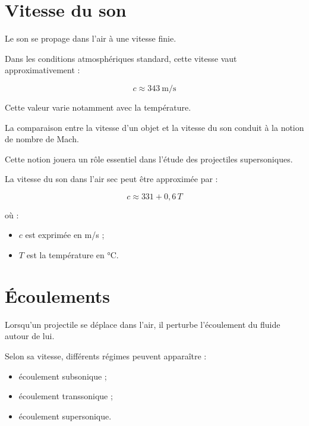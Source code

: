 \section{Vitesse du son}

Le son se propage dans l'air à une vitesse finie.

Dans les conditions atmosphériques standard, cette vitesse vaut
approximativement :

\begin{equation}
c \approx 343~\mathrm{m/s}
\end{equation}

Cette valeur varie notamment avec la température.

La comparaison entre la vitesse d'un objet et la vitesse du son conduit à
la notion de nombre de Mach.

Cette notion jouera un rôle essentiel dans l'étude des projectiles
supersoniques.

\begin{rigueur}

La vitesse du son dans l'air sec peut être approximée par :

\begin{equation}
c \approx 331 + 0,6\,T
\end{equation}

où :

\begin{itemize}
    \item $c$ est exprimée en m/s ;
    \item $T$ est la température en °C.
\end{itemize}

\end{rigueur}

\section{Écoulements}

Lorsqu'un projectile se déplace dans l'air, il perturbe l'écoulement du
fluide autour de lui.

Selon sa vitesse, différents régimes peuvent apparaître :

\begin{itemize}
\item écoulement subsonique ;
\item écoulement transsonique ;
\item écoulement supersonique.
\end{itemize}

